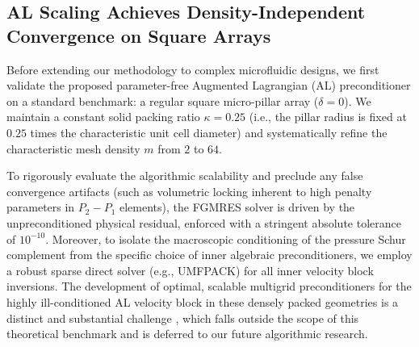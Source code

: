 \documentclass{elsarticle}
\begin{document}
\subsection{AL Scaling Achieves Density-Independent Convergence on Square Arrays}\label{subsec:validation_al_square}

Before extending our methodology to complex microfluidic designs, we first validate the proposed parameter-free Augmented Lagrangian (AL) preconditioner on a standard benchmark: a regular square micro-pillar array ($\delta = 0$). We maintain a constant solid packing ratio $\kappa = 0.25$ (i.e., the pillar radius is fixed at $0.25$ times the characteristic unit cell diameter) and systematically refine the characteristic mesh density $m$ from $2$ to $64$.

To rigorously evaluate the algorithmic scalability and preclude any false convergence artifacts (such as volumetric locking inherent to high penalty parameters in $P_2-P_1$ elements), the FGMRES solver is driven by the unpreconditioned physical residual, enforced with a stringent absolute tolerance of $10^{-10}$. Moreover, to isolate the macroscopic conditioning of the pressure Schur complement from the specific choice of inner algebraic preconditioners, we employ a robust sparse direct solver (e.g., UMFPACK) for all inner velocity block inversions. The development of optimal, scalable multigrid preconditioners for the highly ill-conditioned AL velocity block in these densely packed geometries is a distinct and substantial challenge \cite{Benzi2006, Farrell2019}, which falls outside the scope of this theoretical benchmark and is deferred to our future algorithmic research.
\end{document}
